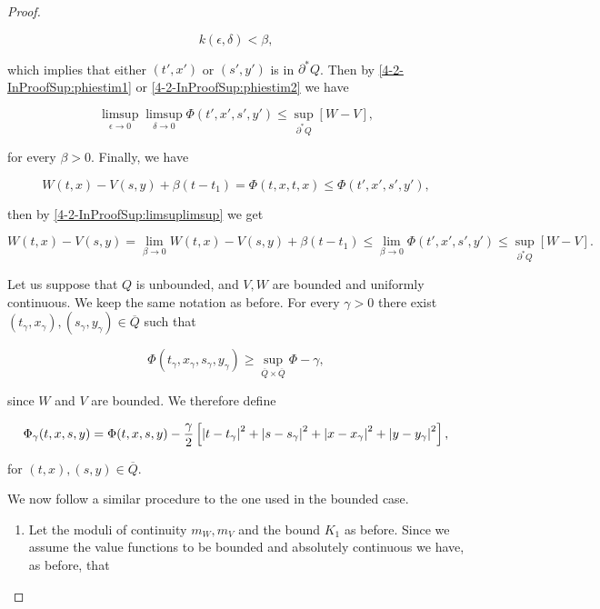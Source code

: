 \begin{proof}
\begin{enumerate}
        \[k(\epsilon,\delta) < \beta,\]

        which implies that either $(t',x')$ or $(s',y')$ is in $\partial^{\ast}Q$. Then by \ref{4-2-InProofSup:phiestim1} 
        or \ref{4-2-InProofSup:phiestim2} we have

        \begin{equation}\label{4-2-InProofSup:limsuplimsup}
            \limsup_{\epsilon\to0}\limsup_{\delta\to0} \Phi(t',x',s',y') \leq \sup_{\partial^{\ast}Q}[W-V],
        \end{equation}

        for every $\beta>0$. Finally, we have

        \[W(t,x) - V(s,y) + \beta(t-t_1) = \Phi(t,x,t,x) \leq \Phi(t',x',s',y'),\]

        then by \ref{4-2-InProofSup:limsuplimsup} we get

        \[W(t,x) - V(s,y) = \lim_{\beta\to0}W(t,x) - V(s,y) + \beta(t-t_1)\leq \lim_{\beta\to0}\Phi(t',x',s',y')\leq \sup_{\partial^{\ast}Q}[W-V].\]
    \end{enumerate}

    Let us suppose that $Q$ is unbounded, and $V,W$ are bounded and uniformly continuous. We keep the same notation as before. For every $\gamma>0$ 
    there exist $(t_{\gamma},x_{\gamma}),(s_{\gamma},y_{\gamma})\in \overline{Q}$ such that
    
    \begin{equation}
        \Phi(t_{\gamma},x_{\gamma},s_{\gamma},y_{\gamma}) \geq \sup_{\overline{Q}\times\overline{Q}}\Phi - \gamma,
    \end{equation}

    since $W$ and $V$ are bounded. We therefore define

    \begin{equation}
        \Phi_{\gamma}(t,x,s,y) = \Phi(t,x,s,y) - \frac{\gamma}{2}\left[\abs{t-t_{\gamma}}^2+\abs{s-s_{\gamma}}^2 + \abs{x-x_{\gamma}}^2 + \abs{y-y_{\gamma}}^2\right],
    \end{equation}

    for $(t,x),(s,y)\in \overline{Q}$. 
    
    We now follow a similar procedure to the one used in the bounded case.

    \begin{enumerate}[label=\arabic*')]
        \item Let the moduli of continuity $m_W,m_V$ and the bound $K_1$ as before. Since we assume the value functions to be bounded and 
        absolutely continuous we have, as before, that
        

\end{enumerate}
\end{proof}
